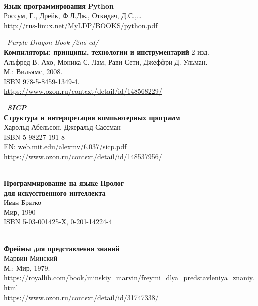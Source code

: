 \begin{thebibliography}{99}

\clearpage
{}\ \\
\textbf{Язык программирования Python}\\
Россум, Г., Дрейк, Ф.Л.Дж., Откидач, Д.С.,\ldots\\
\url{http://rus-linux.net/MyLDP/BOOKS/python.pdf}

\clearpage
{} \ \emph{Purple Dragon Book /2nd ed/}\\
\textbf{Компиляторы: принципы, технологии и инструментарий} 2 изд.\\
Альфред В. Ахо, Моника С. Лам, Рави Сети, Джеффри Д. Ульман.\\
М.: Вильямс, 2008.\\ ISBN 978-5-8459-1349-4.\\
\url{https://www.ozon.ru/context/detail/id/148568229/}

\clearpage
{} \ \textbf{\emph{SICP}\\
\href{https://drive.google.com/file/d/0B0u4WeMjO894X3lnWmhjUktKRk0/view?usp=sharing}{Структура
и интерпретация компьютерных программ}}\\
Харольд Абельсон, Джеральд Сассман\\
ISBN 5-98227-191-8\\
EN: \url{web.mit.edu/alexmv/6.037/sicp.pdf}\\
\url{https://www.ozon.ru/context/detail/id/148537956/}

\clearpage
{}\ \\
\textbf{Программирование на языке Пролог\\для искусственного интеллекта}\\
Иван Братко\\
Мир, 1990\\ ISBN 5-03-001425-Х, 0-201-14224-4

\clearpage
{}\ \\
\textbf{Фреймы для представления знаний}\\
Марвин Минский\\
 М.: Мир, 1979.\\
\url{https://royallib.com/book/minskiy_marvin/freymi_dlya_predstavleniya_znaniy.html}\\
\url{https://www.ozon.ru/context/detail/id/31747338/}


\end{thebibliography}
